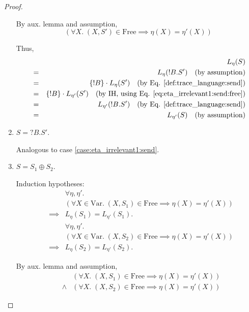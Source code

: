 \documentclass{llncs}
\newcommand*{\Var}{\mathrm{Var}}
\newcommand*{\Free}{\mathrm{Free}}
\newcommand*{\send}{\mathord{!}}
\newcommand*{\recv}{\mathord{?}}
\newcommand*{\echoice}{\oplus}
\newcommand*{\concat}{\cdot}
\renewcommand*{\|}{\;|\;}
\begin{document}
\begin{proof}
\begin{enumerate}
      By aux. lemma and assumption,
      \begin{equation}
        \label{eq:eta_irrelevant1:send:free}
        (\forall X.\; (X, S') \in \Free \implies \eta(X) = \eta'(X))
      \end{equation}

      Thus,
      \begin{eqnarray*}
        &&  L_\eta(S) \\
        &=& L_\eta(\send B.S')
        \quad \text{(by assumption)} \\
        &=& \{\send B\} \concat L_\eta(S')
        \quad \text{(by Eq. \ref{def:trace_language:send})} \\
        &=& \{\send B\} \concat L_{\eta'}(S')
        \quad \text{(by IH, using Eq. \ref{eq:eta_irrelevant1:send:free})} \\
        &=& L_{\eta'}(\send B.S')
        \quad \text{(by Eq. \ref{def:trace_language:send})} \\
        &=&  L_{\eta'}(S)
        \quad \text{(by assumption)}
      \end{eqnarray*}

    \item
      \label{case:eta_irrelevant1:recv}
      $S = \recv B.S'$.

      Analogous to case \ref{case:eta_irrelevant1:send}.

    \item
      \label{case:eta_irrelevant1:echoice}
      $S = S_1 \echoice S_2$.

      Induction hypotheses:
      \begin{eqnarray*}
        &&         \forall \eta, \eta'.\; \\
        &&         (\forall X \in \Var.\; (X, S_1) \in \Free \implies \eta(X) = \eta'(X)) \\
        &\implies& L_\eta(S_1) = L_{\eta'}(S_1). \\
        &&         \forall \eta, \eta'.\; \\
        &&         (\forall X \in \Var.\; (X, S_2) \in \Free \implies \eta(X) = \eta'(X)) \\
        &\implies& L_\eta(S_2) = L_{\eta'}(S_2).
      \end{eqnarray*}

      By aux. lemma and assumption,
      \begin{eqnarray}
        && \label{eq:eta_irrelevant1:echoice:free1}
        (\forall X.\; (X, S_1) \in \Free \implies \eta(X) = \eta'(X)) \\
        &\land& \label{eq:eta_irrelevant1:echoice:free2}
        (\forall X.\; (X, S_2) \in \Free \implies \eta(X) = \eta'(X))
      \end{eqnarray}


\end{enumerate}
\end{proof}
\end{document}
